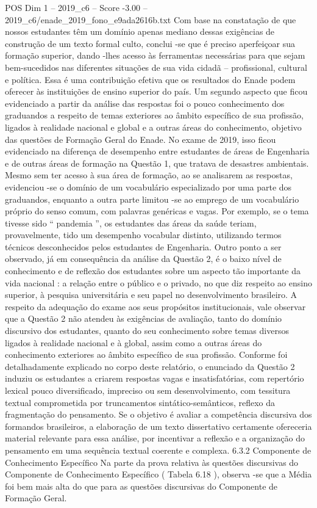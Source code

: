 \begin{textsample}{POS Dim 1 – 2019\_c6 – Score -3.00 – 2019\_c6/enade\_2019\_fono\_e9ada2616b.txt}
Com base na constatação de que nossos estudantes têm um domínio apenas mediano dessas exigências de construção de um texto formal culto, conclui -se que é preciso aperfeiçoar sua formação superior, dando -lhes acesso às ferramentas necessárias para que sejam bem-sucedidos nas diferentes situações de sua vida cidadã – profissional, cultural e política.
Essa é uma contribuição efetiva que os resultados do Enade podem oferecer às instituições de ensino superior do país.
Um segundo aspecto que ficou evidenciado a partir da análise das respostas foi o pouco conhecimento dos graduandos a respeito de temas exteriores ao âmbito específico de sua profissão, ligados à realidade nacional e global e a outras áreas do conhecimento, objetivo das questões de Formação Geral do Enade.
No exame de 2019, isso ficou evidenciado na diferença de desempenho entre estudantes de áreas de Engenharia e de outras áreas de formação na Questão 1, que tratava de desastres ambientais.
Mesmo sem ter acesso à sua área de formação, ao se analisarem as respostas, evidenciou -se o domínio de um vocabulário especializado por uma parte dos graduandos, enquanto a outra parte limitou -se ao emprego de um vocabulário próprio do senso comum, com palavras genéricas e vagas.
Por exemplo, se o tema tivesse sido “ pandemia ”, os estudantes das áreas da saúde teriam, provavelmente, tido um desempenho vocabular distinto, utilizando termos técnicos desconhecidos pelos estudantes de Engenharia.
Outro ponto a ser observado, já em consequência da análise da Questão 2, é o baixo nível de conhecimento e de reflexão dos estudantes sobre um aspecto tão importante da vida nacional : a relação entre o público e o privado, no que diz respeito ao ensino superior, à pesquisa universitária e seu papel no desenvolvimento brasileiro.
A respeito da adequação do exame aos seus propósitos institucionais, vale observar que a Questão 2 não atendeu às exigências de avaliação, tanto do domínio discursivo dos estudantes, quanto do seu conhecimento sobre temas diversos ligados à realidade nacional e à global, assim como a outras áreas do conhecimento exteriores ao âmbito específico de sua profissão.
Conforme foi detalhadamente explicado no corpo deste relatório, o enunciado da Questão 2 induziu os estudantes a criarem respostas vagas e insatisfatórias, com repertório lexical pouco diversificado, impreciso ou sem desenvolvimento, com tessitura textual comprometida por truncamentos sintático-semânticos, reflexo da fragmentação do pensamento.
Se o objetivo é avaliar a competência discursiva dos formandos brasileiros, a elaboração de um texto dissertativo certamente ofereceria material relevante para essa análise, por incentivar a reflexão e a organização do pensamento em uma sequência textual coerente e complexa. 6.3.2 Componente de Conhecimento Específico Na parte da prova relativa às questões discursivas do Componente de Conhecimento Específico ( Tabela 6.18 ), observa -se que a Média foi bem mais alta do que para as questões discursivas do Componente de Formação Geral.

\end{textsample}
